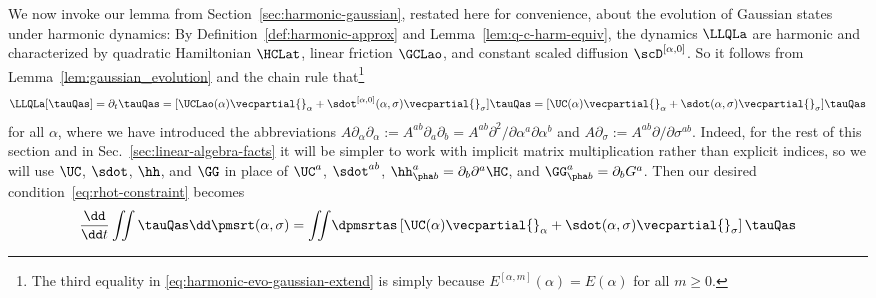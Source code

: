 \documentclass{article}
\numberwithin{equation}{section}
\begin{document}
We now invoke our lemma from Section~\ref{sec:harmonic-gaussian}, restated here for convenience, about the evolution of Gaussian states under harmonic dynamics:
\lemGaussHarmEvo*
\noindent By Definition~\ref{def:harmonic-approx} and Lemma~\ref{lem:q-c-harm-equiv}, the dynamics $\LLQLa$ are harmonic and characterized by quadratic Hamiltonian $\HCLat$, linear friction $\GCLao$, and constant scaled diffusion $\scD^{[\alpha,0]}$.  So it follows from Lemma~\ref{lem:gaussian_evolution} and the chain rule that\footnote{The third equality in \eqref{eq:harmonic-evo-gaussian-extend} is simply because $E^{[\alpha,m]}(\alpha) = E(\alpha)$ for all $m\ge 0$.} 
\begin{align}\label{eq:harmonic-evo-gaussian-extend}
    \LLQLa [\tauQas] = \partial_t \tauQas
    = [
    \UCLao(\alpha) 
    \vecpartial{}_\alpha + \sdot^{[\alpha,0]}(\alpha,\sigma) \vecpartial{}_\sigma] \tauQas = [\UC(\alpha) \vecpartial{}_\alpha + \sdot(\alpha,\sigma) \vecpartial{}_\sigma] \tauQas
\end{align}
for all $\alpha$, 
where we have introduced the abbreviations $A  \partial_{\alpha}\partial_{\alpha} := A^{ab} \partial_{a}\partial_{b} = A^{ab} \partial^2/\partial \alpha^{a}\partial \alpha^{b}$ and $A  \partial_{\sigma} := A^{ab} \partial/\partial \sigma^{ab}$.
Indeed, for the rest of this section and in Sec.~\ref{sec:linear-algebra-facts} it will be simpler to work with implicit matrix multiplication rather than explicit indices, so we will use $\UC$, $\sdot$, $\hh$, and $\GG$ in place of $\UC^a$, $\sdot^{ab}$, $\hh^a_{\pha b} =
\partial_b \partial^a \HC$, and $\GG^a_{\pha b} = \partial_b G^a$.
Then our desired condition~\eqref{eq:rhot-constraint} becomes
\begin{equation}
\label{eq:pas-weak-eq}
\begin{split}
     \frac{\dd}{\dd t} \iint \tauQas \dd\pmsrt(\alpha,\sigma)
    = \iint \! \dpmsrtas 
    \left[\UC(\alpha) \vecpartial{}_\alpha + \sdot(\alpha,\sigma) \vecpartial{}_\sigma\right]
    \tauQas 
\end{split}
\end{equation}
\end{document}

